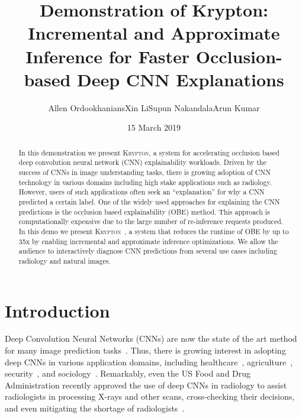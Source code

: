 \documentclass{vldb}
\newcommand{\system}{\textsc{Krypton}}
\begin{document}
\title{Demonstration of Krypton: Incremental and Approximate Inference for Faster Occlusion-based Deep CNN Explanations}


\author{
\alignauthor Allen Ordookhanians\hspace{10mm}Xin Li\hspace{10mm}Supun Nakandala\hspace{10mm}Arun Kumar\\
}

\date{15 March 2019}


\maketitle

\begin{abstract}
In this demonstration we present \system, a system for accelerating occlusion based deep convolution neural network (CNN) explainability workloads.
Driven by the success of CNNs in image understanding tasks, there is growing adoption of CNN technology in various domains including high stake applications such as radiology.
However, users of such applications often seek an ``explanation'' for why a CNN predicted a certain label.
One of the widely used approaches for explaining the CNN predictions is the occlusion based explainability (OBE) method.
This approach is computationally expensive due to the large number of re-inference requests produced.
In this demo we present \system~, a system that reduces the runtime of OBE by up to 35x by enabling incremental and approximate inference optimizations.
We allow the audience to interactively diagnose CNN predictions from several use cases including radiology and natural images.
\end{abstract}




\section{Introduction}\label{introduction}
Deep Convolution Neural Networks (CNNs) are now the state of the art method for many image prediction tasks~\cite{imagenet}. Thus, there is growing interest in adopting deep CNNs in various application domains, including healthcare~\cite{kermany2018identifying, islam2017abnormality}, agriculture~\cite{mohanty2016using}, security~\cite{arbabzadah2016identifying}, and sociology~\cite{wang2017deep}. Remarkably, even the US Food and Drug Administration recently approved the use of deep CNNs in radiology to assist radiologists in processing X-rays and other scans, cross-checking their decisions, and even mitigating the shortage of radiologists~\cite{fdaretinopathy,radiologistshortage}.
\end{document}
